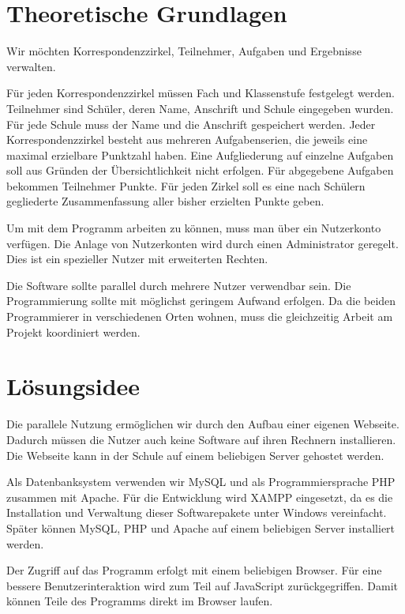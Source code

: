 \chapter{Theoretische Grundlagen}

Wir möchten Korrespondenzzirkel, Teilnehmer, Aufgaben und Ergebnisse verwalten.

Für jeden Korrespondenzzirkel müssen Fach und Klassenstufe festgelegt werden. 
Teilnehmer sind Schüler, deren Name, Anschrift und Schule eingegeben wurden. Für jede Schule muss der Name und die Anschrift gespeichert werden. 
Jeder Korrespondenzzirkel besteht aus mehreren Aufgabenserien, die jeweils eine maximal erzielbare Punktzahl haben. Eine Aufgliederung auf einzelne Aufgaben soll aus Gründen der Übersichtlichkeit nicht erfolgen.
Für abgegebene Aufgaben bekommen Teilnehmer Punkte. Für jeden Zirkel soll es eine nach Schülern gegliederte Zusammenfassung aller bisher erzielten Punkte geben.

Um mit dem Programm arbeiten zu können, muss man über ein Nutzerkonto verfügen. Die Anlage von Nutzerkonten wird durch einen Administrator geregelt. Dies ist ein spezieller Nutzer mit erweiterten Rechten.

Die Software sollte parallel durch mehrere Nutzer verwendbar sein.
Die Programmierung sollte mit möglichst geringem Aufwand erfolgen.
Da die beiden Programmierer in verschiedenen Orten wohnen, muss die gleichzeitig Arbeit am Projekt koordiniert werden.

\chapter{Lösungsidee}

Die parallele Nutzung ermöglichen wir durch den Aufbau einer eigenen Webseite. Dadurch müssen die Nutzer auch keine Software auf ihren Rechnern installieren. Die Webseite kann in der Schule auf einem beliebigen Server gehostet werden. 

Als Datenbanksystem verwenden wir MySQL und als Programmiersprache PHP zusammen mit Apache. Für die Entwicklung wird XAMPP eingesetzt, da es die Installation und Verwaltung dieser Softwarepakete unter Windows vereinfacht. Später können MySQL, PHP und Apache auf einem beliebigen Server installiert werden. \cite{Xampp}

Der Zugriff auf das Programm erfolgt mit einem beliebigen Browser. Für eine bessere Benutzerinteraktion wird zum Teil auf JavaScript zurückgegriffen. Damit können Teile des Programms direkt im Browser laufen.

